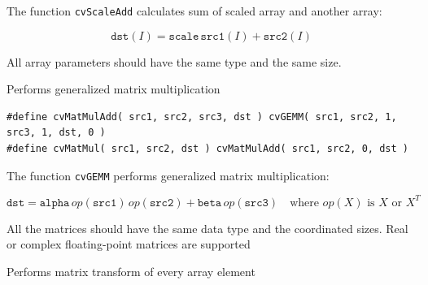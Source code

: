 The function \texttt{cvScaleAdd} calculates sum of scaled array and another array:

\[
\texttt{dst}(I)=\texttt{scale} \, \texttt{src1}(I) + \texttt{src2}(I)
\]

All array parameters should have the same type and the same size.

\label{GEMM}

Performs generalized matrix multiplication

\begin{lstlisting}
#define cvMatMulAdd( src1, src2, src3, dst ) cvGEMM( src1, src2, 1, src3, 1, dst, 0 )
#define cvMatMul( src1, src2, dst ) cvMatMulAdd( src1, src2, 0, dst )
\end{lstlisting}

\begin{description}
\end{description}

The function \texttt{cvGEMM} performs generalized matrix multiplication:

\[
\texttt{dst} = \texttt{alpha} \, op(\texttt{src1}) \, op(\texttt{src2}) + \texttt{beta} \, op(\texttt{src3}) \quad \text{where $op(X)$ is $X$ or $X^T$}
\]

All the matrices should have the same data type and the coordinated sizes. Real or complex floating-point matrices are supported

\label{Transform}

Performs matrix transform of every array element


